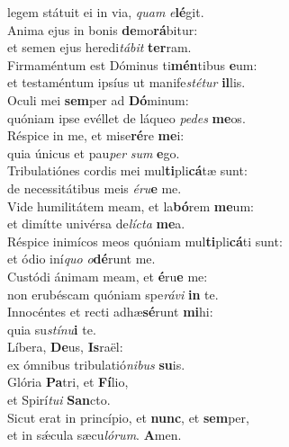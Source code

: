 \oddverse legem státuit ei in via, \textit{quam} \textit{e}\textbf{lé}git.\\
\evenverse Anima ejus in bonis \textbf{de}mo\textbf{rá}bitur:~\*\\
\evenverse et semen ejus heredi\textit{tá}\textit{bit} \textbf{ter}ram.\\
\oddverse Firmaméntum est Dóminus ti\textbf{mén}tibus \textbf{e}um:~\*\\
\oddverse et testaméntum ipsíus ut manife\textit{sté}\textit{tur} \textbf{il}lis.\\
\evenverse Oculi mei \textbf{sem}per ad \textbf{Dó}minum:~\*\\
\evenverse quóniam ipse evéllet de láqueo \textit{pe}\textit{des} \textbf{me}os.\\
\oddverse Réspice in me, et mise\textbf{ré}re \textbf{me}i:~\*\\
\oddverse quia únicus et pau\textit{per} \textit{sum} \textbf{e}go.\\
\evenverse Tribulatiónes cordis mei mul\textbf{ti}pli\textbf{cá}tæ sunt:~\*\\
\evenverse de necessitátibus meis \textit{é}\textit{ru}\textbf{e} me.\\
\oddverse Vide humilitátem meam, et la\textbf{bó}rem \textbf{me}um:~\*\\
\oddverse et dimítte univérsa de\textit{lí}\textit{cta} \textbf{me}a.\\
\evenverse Réspice inimícos meos quóniam mul\textbf{ti}pli\textbf{cá}ti sunt:~\*\\
\evenverse et ódio iní\textit{quo} \textit{o}\textbf{dé}runt me.\\
\oddverse Custódi ánimam meam, et \textbf{é}ru\textbf{e} me:~\*\\
\oddverse non erubéscam quóniam spe\textit{rá}\textit{vi} \textbf{in} te.\\
\evenverse Innocéntes et recti adhæ\textbf{sé}runt \textbf{mi}hi:~\*\\
\evenverse quia su\textit{stí}\textit{nu}\textbf{i} te.\\
\oddverse Líbera, \textbf{De}us, \textbf{Is}raël:~\*\\
\oddverse ex ómnibus tribulatió\textit{ni}\textit{bus} \textbf{su}is.\\
\evenverse Glória \textbf{Pa}tri, et \textbf{Fí}lio,~\*\\
\evenverse et Spirí\textit{tu}\textit{i} \textbf{San}cto.\\
\oddverse Sicut erat in princípio, et \textbf{nunc}, et \textbf{sem}per,~\*\\
\oddverse et in sǽcula sæcu\textit{ló}\textit{rum}. \textbf{A}men.\\
